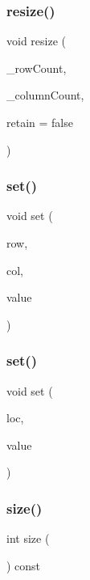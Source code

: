 \subsubsection{\texorpdfstring{resize()}{resize()}}
{\footnotesize\ttfamily void resize (\begin{DoxyParamCaption}\item[{int}]{\+\_\+row\+Count,  }\item[{int}]{\+\_\+column\+Count,  }\item[{bool}]{retain = {\ttfamily false} }\end{DoxyParamCaption})}

\mbox{\label{classGrid_a6f5cee26d171f36d280a15c51332efc2}} 
\subsubsection{\texorpdfstring{set()}{set()}\hspace{0.1cm}{\footnotesize\ttfamily [1/2]}}
{\footnotesize\ttfamily void set (\begin{DoxyParamCaption}\item[{int}]{row,  }\item[{int}]{col,  }\item[{const Value\+Type \&}]{value }\end{DoxyParamCaption})}

\mbox{\label{classGrid_a02a61287a9aee6a1ff7e8a8325ce094d}} 
\subsubsection{\texorpdfstring{set()}{set()}\hspace{0.1cm}{\footnotesize\ttfamily [2/2]}}
{\footnotesize\ttfamily void set (\begin{DoxyParamCaption}\item[{const \mbox{\hyperlink{structGridLocation}{Grid\+Location}} \&}]{loc,  }\item[{const Value\+Type \&}]{value }\end{DoxyParamCaption})}

\mbox{\label{classGrid_af9593d4a5ff4274efaf429cb4f9e57cc}} 
\subsubsection{\texorpdfstring{size()}{size()}}
{\footnotesize\ttfamily int size (\begin{DoxyParamCaption}{ }\end{DoxyParamCaption}) const}

